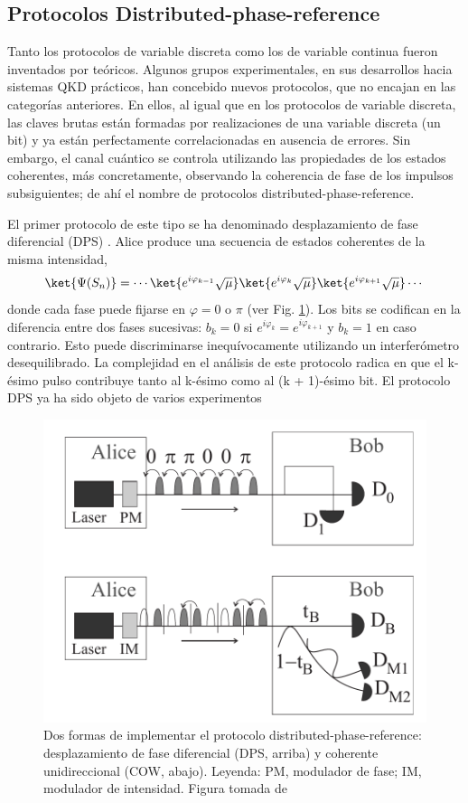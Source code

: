 \documentclass[a4paper,11pt]{book} %
\numberwithin{equation}{chapter}
\begin{document}
		\subsection{Protocolos Distributed-phase-reference} \label{subsec_QKD_phase}
		
Tanto los protocolos de variable discreta como los de variable continua fueron inventados por teóricos. Algunos grupos experimentales, en sus desarrollos hacia sistemas QKD prácticos, han concebido nuevos protocolos, que no encajan en las categorías anteriores. En ellos, al igual que en los protocolos de variable discreta, las claves brutas están formadas por realizaciones de una variable discreta (un bit) y ya están perfectamente correlacionadas en ausencia de errores. Sin embargo, el canal cuántico se controla utilizando las propiedades de los estados coherentes, más concretamente, observando la coherencia de fase de los impulsos subsiguientes; de ahí el nombre de protocolos distributed-phase-reference.

El primer protocolo de este tipo se ha denominado desplazamiento de fase diferencial (DPS) \cite{Phase_Inoue_2002,Phase_Inoue_2003}. Alice produce una secuencia de estados coherentes de la misma intensidad,
	\begin{equation}
	\ket{ \Psi (S_n)} = \cdots \ket{e^{i \varphi_{k-1}} \sqrt{\mu}} \ket{e^{i \varphi_k} \sqrt{\mu}} \ket{e^{i \varphi_{k+1}} \sqrt{\mu}} \cdots
	\end{equation}
donde cada fase puede fijarse en $\varphi = 0$ o $\pi$ (ver Fig. \ref{Fig_QKD_DFR}). Los bits se codifican en la diferencia entre dos fases sucesivas: $b_k = 0$ si $e^{i \varphi_k} = e^{i \varphi_{k+1}}$ y $b_k = 1$ en caso contrario. Esto puede discriminarse inequívocamente utilizando un interferómetro desequilibrado. La complejidad en el análisis de este protocolo radica en que el k-ésimo pulso contribuye tanto al k-ésimo como al (k + 1)-ésimo bit. El protocolo DPS ya ha sido objeto de varios experimentos \cite{QKD_DFR_Takesue_2005,QKD_DFR_Takesue_2007,QKD_DFR_Diamanti_2006}

	\begin{figure}[t]
	\centering 
	\includegraphics[width=0.6\linewidth]{Figuras/Fig_QKD_DFR.png}
	\caption{Dos formas de implementar el protocolo distributed-phase-reference: desplazamiento de fase diferencial (DPS, arriba) y coherente unidireccional (COW, abajo). Leyenda: PM, modulador de fase; IM, modulador de intensidad. Figura tomada de \cite{QKD_resumen}}
	\label{Fig_QKD_DFR}
	\end{figure}
\end{document}

